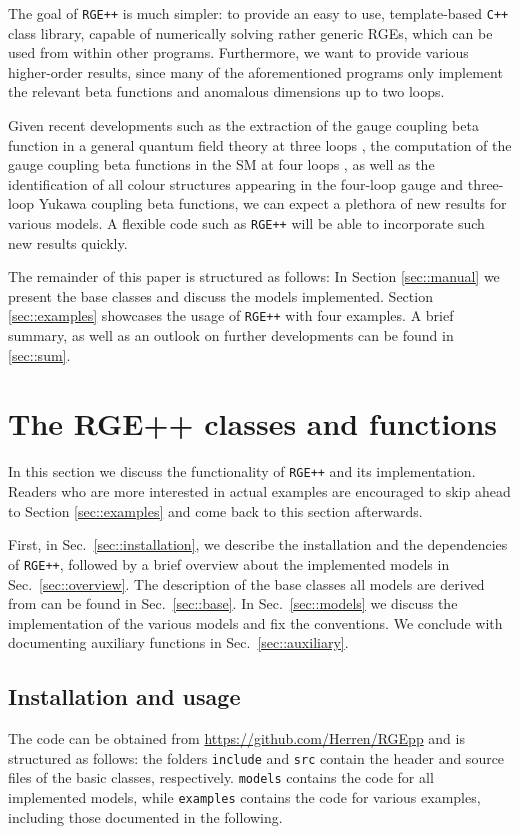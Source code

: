 \documentclass[11pt,a4paper]{article}
\begin{document}
The goal of \texttt{RGE++} is much simpler: to provide an easy to use, template-based \texttt{C++} class library, capable of numerically solving rather generic
RGEs, which can be used from within other programs. Furthermore, we want to provide various higher-order results, since many of
the aforementioned programs only implement the relevant beta functions and anomalous dimensions up to two loops. 

Given recent developments
such as the extraction of the gauge coupling beta function in a general quantum field theory at three loops \cite{Poole:2019txl,Poole:2019kcm}, the computation
of the gauge coupling beta functions in the SM at four loops \cite{Davies:2019onf}, as well as the identification of all colour structures appearing in the four-loop
gauge and three-loop Yukawa coupling beta functions, we can expect a plethora of new results for various models. A flexible code such as \texttt{RGE++}
will be able to incorporate such new results quickly.

The remainder of this paper is structured as follows: In Section \ref{sec::manual} we present the base classes and discuss the models implemented.
Section \ref{sec::examples} showcases the usage of \texttt{RGE++} with four examples.
A brief summary, as well as an outlook on further developments can be found in \ref{sec::sum}.


\section{\label{sec::manual}The RGE++ classes and functions}
In this section we discuss the functionality of \texttt{RGE++} and its implementation. Readers who are more interested in actual examples are encouraged to skip ahead to
Section \ref{sec::examples} and come back to this section afterwards.

First, in Sec.~\ref{sec::installation}, we describe the installation and the dependencies of \texttt{RGE++},
followed by a brief overview about the implemented models in Sec.~\ref{sec::overview}.
The description of the base classes all models are derived from can be found in Sec.~\ref{sec::base}. In Sec.~\ref{sec::models} we discuss the implementation of the various models
and fix the conventions. We conclude with documenting auxiliary functions in Sec.~\ref{sec::auxiliary}.

\subsection{\label{sec::installation}Installation and usage}
The code can be obtained from \url{https://github.com/Herren/RGEpp} and is structured as follows: the folders \texttt{include} and \texttt{src} contain the header and source files of the basic classes, respectively.
\texttt{models} contains the code for all implemented models, while \texttt{examples} contains the code for various examples, including those documented in the following.
\end{document}
